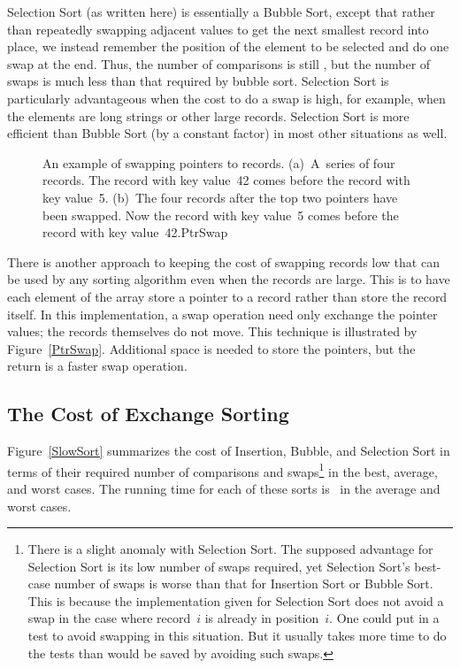 
Selection Sort (as written here) is essentially a Bubble Sort,
except that rather than repeatedly swapping adjacent values to get
the next smallest record into place, we instead remember the position
of the element to be selected and do one swap at the end.
Thus, the number of comparisons is still \Thetantwo, but the number of
swaps is much less than that required by bubble sort.
Selection Sort is particularly advantageous when the cost to do a swap
is high, for example, when the elements are long strings or other
large records.
Selection Sort is more efficient than Bubble Sort (by a constant
factor) in most other situations as well.

\begin{figure}
\vspace{-\medskipamount}
\vspace{-\smallskipamount}
{An example of swapping pointers to records.
(a)~A~series of four records.
The record with key value~42 comes before the record with key value~5.
(b)~The four records after the top two pointers have been swapped.
Now the record with key value~5 comes before the record with key
value~42.}{PtrSwap}
\bigskip
\end{figure}

There is another approach to keeping the cost of swapping records low
that can be used by any sorting algorithm even when the records are
large.
This is to have each element of the array store a pointer to a record
rather than store the record itself.
In this implementation, a swap operation need only exchange the
pointer values; the records themselves do not move.
This technique is illustrated by Figure~\ref{PtrSwap}.
Additional space is needed to store the pointers, but the
return is a faster swap operation.

\subsection{The Cost of Exchange Sorting}

Figure~\ref{SlowSort} summarizes the cost of Insertion, Bubble, and
Selection Sort in terms of their required number of comparisons and
swaps\footnote{There is a slight anomaly with Selection Sort.
The supposed advantage for Selection Sort is its low number of swaps
required, yet Selection Sort's best-case number of swaps is worse than
that for Insertion Sort or Bubble Sort.
This is because the implementation given for Selection Sort does not
avoid a swap in the case where record~\(i\) is already in
position~\(i\).
One could put in a test to avoid swapping in this situation.
But it usually takes more time to do the tests
than would be saved by avoiding such swaps.}
in the best, average, and worst cases.
The running time for each of these sorts is \Thetantwo\ in
the average and worst cases.

